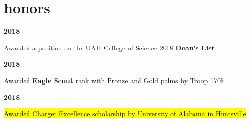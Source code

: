 \documentclass[9pt]{article}
\newcommand{\entry}[2]{
	\begin{minipage}[c]{.14\textwidth}
		{\small\textbf{#1}}\hfill
	\end{minipage}
	{\color{OliveGreen}\hfill \vline \hfill}
	\begin{minipage}[c]{.8\textwidth}
		#2
	\end{minipage}\vspace{.12in}
	}
\begin{document}
\section{honors}
\textit{}

	\entry{2018}{Awarded a position on the UAH College of Science 2018 \textbf{Dean's List}}

	\entry{2018}{Awarded \textbf{Eagle Scout} rank with Bronze and Gold palms by Troop 1705}

	\entry{2018}{\hl{Awarded Charger Excellence scholarship by University of Alabama in Huntsville}}

\end{document}
